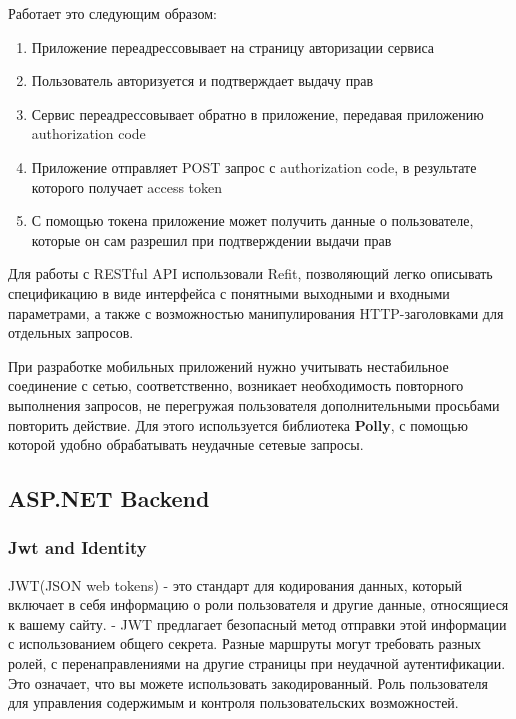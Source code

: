 \documentclass[14pt]{matmex-diploma-custom}
\begin{document}
        Работает это следующим образом:
        \begin{enumerate}
            \item Приложение переадрессовывает на страницу авторизации сервиса
            \item Пользователь авторизуется и подтверждает выдачу прав
            \item Сервис переадрессовывает обратно в приложение, передавая приложению authorization code
            \item Приложение отправляет POST запрос с authorization code, в результате которого получает access token
            \item С помощью токена приложение может получить данные о пользователе, которые он сам разрешил при подтверждении выдачи прав
        \end{enumerate}

        Для работы с RESTful API использовали Refit,
        позволяющий легко описывать спецификацию в виде интерфейса с понятными выходными и входными параметрами,
        а также с возможностью манипулирования HTTP-заголовками для отдельных запросов.

        При разработке мобильных приложений нужно учитывать нестабильное соединение с сетью,
        соответственно, возникает необходимость повторного выполнения запросов,
        не перегружая пользователя дополнительными просьбами повторить действие.
        Для этого используется библиотека \textbf{Polly}\cite{polly_github}, с помощью которой удобно обрабатывать неудачные сетевые запросы.

        \subsection{ASP.NET Backend}
            \subsubsection{Jwt and Identity}
                JWT(JSON web tokens) - это стандарт для кодирования данных, который включает в себя информацию о роли пользователя и другие данные, относящиеся к вашему сайту.
                - JWT предлагает безопасный метод отправки этой информации с использованием общего секрета.
                Разные маршруты могут требовать разных ролей, с перенаправлениями на другие страницы при неудачной аутентификации.
                Это означает, что вы можете использовать закодированный.
                Роль пользователя для управления содержимым и контроля пользовательских возможностей.
    
\end{document}
